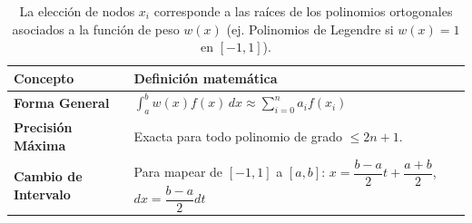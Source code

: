 \documentclass[12pt]{article}
\begin{document}
\begin{table}[htbp]
    \centering
    \renewcommand{\arraystretch}{2.2}
    \vspace{0.2cm}
    \caption{Reglas compuestas. En todas las fórmulas de error, $\mu \in (a, b)$.}
\end{table}

\pagebreak 

\begin{table}[htbp]
    \centering
    \renewcommand{\arraystretch}{1.8}
    \begin{tabular}{@{}ll@{}}
        \toprule
        \textbf{Concepto} & \textbf{Definición matemática} \\
        \midrule
        \textbf{Forma General} 
        & $\int_a^b w(x) f(x) \, dx \approx \displaystyle\sum_{i=0}^n a_i f(x_i)$ \\
        
        \textbf{Precisión Máxima} 
        & Exacta para todo polinomio de grado $\le 2n+1$. \\
        
        \textbf{Cambio de Intervalo} 
        & Para mapear de $[-1, 1]$ a $[a, b]$: \quad $x = \dfrac{b-a}{2}t + \dfrac{a+b}{2}$, \quad $dx = \dfrac{b-a}{2} dt$ \\
        \bottomrule
    \end{tabular}
    \caption{La elección de nodos $x_i$ corresponde a las raíces de los
    polinomios ortogonales asociados a la función de peso $w(x)$ (ej. Polinomios
de Legendre si $w(x)=1$ en $[-1, 1]$).}
\end{table}
\end{document}
